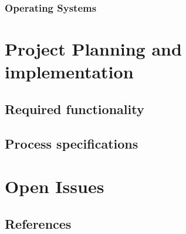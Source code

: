 \documentclass[a4paper,12pt]{article}
\begin{document}
	\subsubsection{Operating Systems}
\newpage
\section{Project Planning and implementation}
	
\subsection{Required functionality}

\subsection{Process specifications}

\newpage
\section{Open Issues}

\subsection{References}
\end{document}

